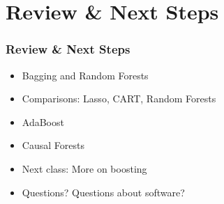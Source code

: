 \documentclass[
  shownotes,
  xcolor={svgnames},
  hyperref={colorlinks,citecolor=DarkBlue,linkcolor=DarkRed,urlcolor=DarkBlue}
  , aspectratio=169]{beamer}
\begin{document}
\section{Review
 \& Next Steps}
\begin{frame}
\frametitle{Review \& Next Steps}
  
\begin{itemize} 
    \item Bagging and Random Forests
    \medskip
    \item Comparisons: Lasso, CART, Random Forests
    \medskip
    \item AdaBoost
    \medskip
    \item Causal Forests

    \bigskip  
  \item  Next class:  More on boosting


\bigskip  
\item Questions? Questions about software? 

\end{itemize}
\end{frame}
\end{document}
